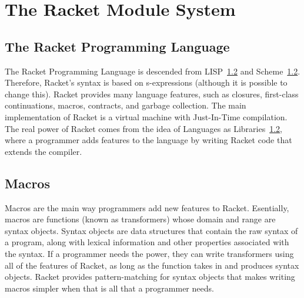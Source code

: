 \chapter{The Racket Module System}

\section{The Racket Programming Language}
The Racket Programming Language is descended from LISP~\ref{} and Scheme~\ref{}.
Therefore, Racket's syntax is based on s-expressions (although it is possible to change this).
Racket provides many language features, such as closures, first-class continuations, macros, contracts, and garbage collection.
The main implementation of Racket is a virtual machine with Just-In-Time compilation. 
The real power of Racket comes from the idea of Languages as Libraries~\ref{}, where a programmer adds features to the language by writing Racket code that extends the compiler.

\section{Macros}
Macros are the main way programmers add new features to Racket. 
Esentially, macros are functions (known as transformers) whose domain and range are syntax objects.
Syntax objects are data structures that contain the raw syntax of a program, along with lexical information and other properties associated with the syntax.
If a programmer needs the power, they can write transformers using all of the features of Racket, as long as the function takes in and produces syntax objects.
Racket provides pattern-matching for syntax objects that makes writing macros simpler when that is all that a programmer needs.

